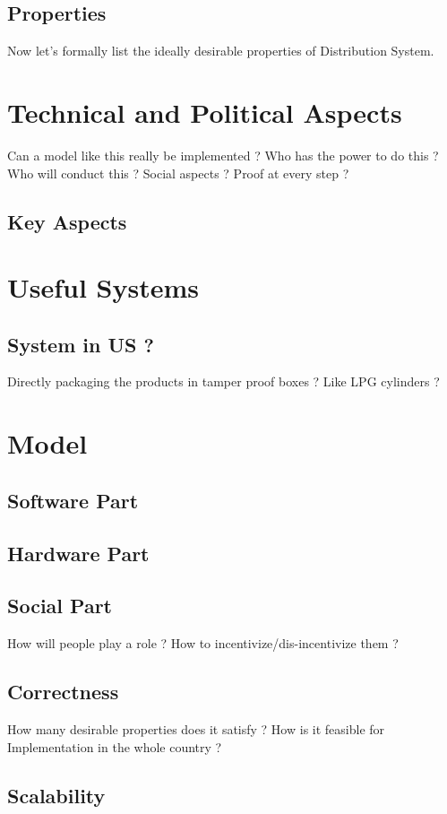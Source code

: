 \documentclass[12pt]{report}
\begin{document}
\section{Properties}
Now let's formally list the ideally desirable properties of Distribution System.

\chapter{Technical and Political Aspects}
Can a model like this really be implemented ? Who has the power to do this ? Who will conduct this ?
Social aspects ? Proof at every step ?
\section{Key Aspects}

\chapter{Useful Systems}
\section{System in US ?}
Directly packaging the products in tamper proof boxes ? Like LPG cylinders ? 

\chapter{Model}
\section{Software Part}
\section{Hardware Part}
\section{Social Part}
How will people play a role ? How to incentivize/dis-incentivize them ?
\section{Correctness}
How many desirable properties does it satisfy ? How is it feasible for Implementation in the whole country ?
\section{Scalability}
\end{document}
